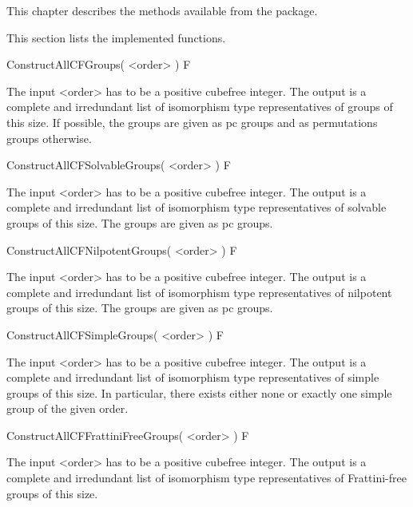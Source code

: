 


This chapter describes the methods available from the {\Cubefree} package.




This section lists the implemented functions.


\>ConstructAllCFGroups( <order> ) F

The input <order> has to be a positive cubefree integer. The output is a complete and irredundant list of isomorphism
type representatives of groups of this size. If possible, the groups are given
as pc groups and as permutations groups otherwise.

\>ConstructAllCFSolvableGroups( <order> ) F

The input <order> has to be a positive cubefree integer. The output is a complete and irredundant list of isomorphism
type representatives of solvable groups of this size. The groups are given as pc groups.

\>ConstructAllCFNilpotentGroups( <order> ) F

The input <order> has to be a positive cubefree integer. The output is a complete and irredundant list of isomorphism
type representatives of nilpotent groups of this size. The groups are given as pc groups.

\>ConstructAllCFSimpleGroups( <order> ) F

The input <order> has to be a positive cubefree integer. The output is a complete and irredundant list of isomorphism
type representatives of simple groups of this size. In particular, there
exists either none or exactly one simple group of the given order.

\>ConstructAllCFFrattiniFreeGroups( <order> ) F

The input <order> has to be a positive cubefree integer. The output is a complete and irredundant list of isomorphism
type representatives of Frattini-free groups of this size.

